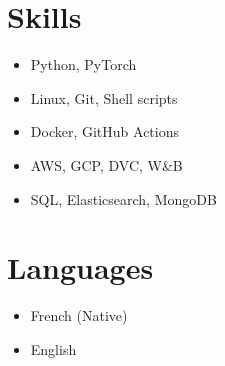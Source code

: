 \documentclass[a4paper,10pt]{article}
\begin{document}
\begin{adjustbox}{valign=t}
\begin{minipage}{0.3\textwidth}
        \section*{Skills}
        \raggedright
        \begin{itemize}
            \itemsep0em
            \item Python, PyTorch
            \item Linux, Git, Shell scripts
            \item Docker, GitHub Actions
            \item AWS, GCP, DVC, W\&B
            \item SQL, Elasticsearch, MongoDB
        \end{itemize}
        \vspace{-.5cm}
        \section*{Languages}
        \raggedright
        \begin{itemize}
            \itemsep0em
            \item French (Native)
            \item English
        \end{itemize}
        \vspace{-.5cm}
    \end{minipage}
\end{adjustbox}
\hfill
\begin{adjustbox}{valign=t}
    \begin{minipage}{0.02\textwidth}
        \MyVerticalRule
    \end{minipage}
\end{adjustbox}
\hfill
\end{document}
